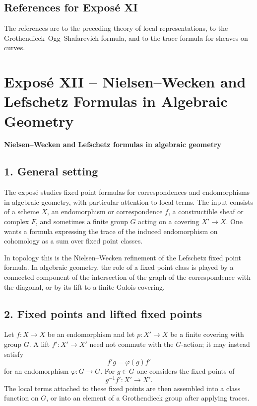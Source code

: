 \documentclass[14pt]{extarticle}
\begin{document}
\subsection*{References for Expos\'e XI}

The references are to the preceding theory of local representations, to the Grothendieck--Ogg--Shafarevich formula, and to the trace formula for sheaves on curves.

\newpage

\section*{Expos\'e XII -- Nielsen--Wecken and Lefschetz Formulas in Algebraic Geometry}

\begin{center}
\textbf{Nielsen--Wecken and Lefschetz formulas in algebraic geometry}
\end{center}

\subsection*{1. General setting}

The expos\'e studies fixed point formulas for correspondences and endomorphisms in algebraic geometry, with particular attention to local terms. The input consists of a scheme $X$, an endomorphism or correspondence $f$, a constructible sheaf or complex $F$, and sometimes a finite group $G$ acting on a covering $X'\to X$. One wants a formula expressing the trace of the induced endomorphism on cohomology as a sum over fixed point classes.

In topology this is the Nielsen--Wecken refinement of the Lefschetz fixed point formula. In algebraic geometry, the role of a fixed point class is played by a connected component of the intersection of the graph of the correspondence with the diagonal, or by its lift to a finite Galois covering.

\subsection*{2. Fixed points and lifted fixed points}

Let $f:X\to X$ be an endomorphism and let $p:X'\to X$ be a finite covering with group $G$. A lift $f':X'\to X'$ need not commute with the $G$-action; it may instead satisfy
\[
   f' g = \varphi(g) f'
\]
for an endomorphism $\varphi:G\to G$. For $g\in G$ one considers the fixed points of
\[
   g^{-1}f':X'\to X'.
\]
The local terms attached to these fixed points are then assembled into a class function on $G$, or into an element of a Grothendieck group after applying traces.
\end{document}
